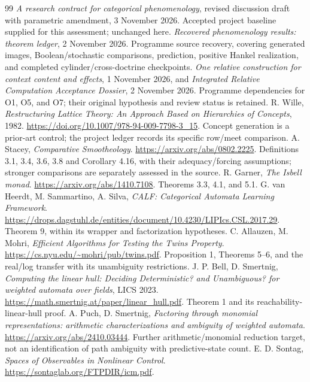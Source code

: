 \documentclass[11pt]{article}
\theoremstyle{remark}
\begin{document}
\begin{thebibliography}{99}
 \emph{A research contract for categorical phenomenology}, revised discussion draft with parametric amendment, 3 November 2026. Accepted project baseline supplied for this assessment; unchanged here.
 \emph{Recovered phenomenology results: theorem ledger}, 2 November 2026. Programme source recovery, covering generated images, Boolean/stochastic comparisons, prediction, positive Hankel realization, and completed cylinder/cross-doctrine checkpoints.
 \emph{One relative construction for context content and effects}, 1 November 2026, and \emph{Integrated Relative Computation Acceptance Dossier}, 2 November 2026. Programme dependencies for O1, O5, and O7; their original hypothesis and review status is retained.
 R. Wille, \emph{Restructuring Lattice Theory: An Approach Based on Hierarchies of Concepts}, 1982. \url{https://doi.org/10.1007/978-94-009-7798-3_15}. Concept generation is a prior-art control; the project ledger records its specific row/meet comparison.
 A. Stacey, \emph{Comparative Smootheology}. \url{https://arxiv.org/abs/0802.2225}. Definitions 3.1, 3.4, 3.6, 3.8 and Corollary 4.16, with their adequacy/forcing assumptions; stronger comparisons are separately assessed in the source.
 R. Garner, \emph{The Isbell monad}. \url{https://arxiv.org/abs/1410.7108}. Theorems 3.3, 4.1, and 5.1.
 G. van Heerdt, M. Sammartino, A. Silva, \emph{CALF: Categorical Automata Learning Framework}. \url{https://drops.dagstuhl.de/entities/document/10.4230/LIPIcs.CSL.2017.29}. Theorem 9, within its wrapper and factorization hypotheses.
 C. Allauzen, M. Mohri, \emph{Efficient Algorithms for Testing the Twins Property}. \url{https://cs.nyu.edu/~mohri/pub/twins.pdf}. Proposition 1, Theorems 5--6, and the real/log transfer with its unambiguity restrictions.
 J. P. Bell, D. Smertnig, \emph{Computing the linear hull: Deciding Deterministic? and Unambiguous? for weighted automata over fields}, LICS 2023. \url{https://math.smertnig.at/paper/linear_hull.pdf}. Theorem 1 and its reachability-linear-hull proof.
 A. Puch, D. Smertnig, \emph{Factoring through monomial representations: arithmetic characterizations and ambiguity of weighted automata}. \url{https://arxiv.org/abs/2410.03444}. Further arithmetic/monomial reduction target, not an identification of path ambiguity with predictive-state count.
 E. D. Sontag, \emph{Spaces of Observables in Nonlinear Control}. \url{https://sontaglab.org/FTPDIR/icm.pdf}.

\end{thebibliography}
\end{document}
